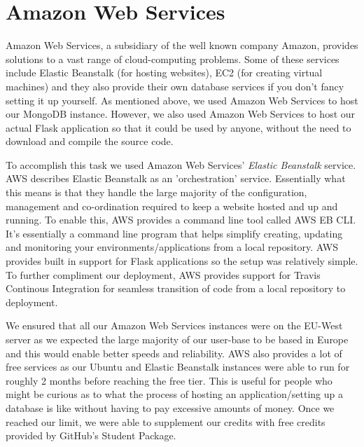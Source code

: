 \section{Amazon Web Services}
Amazon Web Services, a subsidiary of the well known company Amazon, provides solutions to a vast range of cloud-computing problems. Some of these services include Elastic Beanstalk (for hosting websites), EC2 (for creating virtual machines) and they also provide their own database services if you don't fancy setting it up yourself.
As mentioned above, we used Amazon Web Services to host our MongoDB instance. However, we also used Amazon Web Services to host our actual Flask application so that it could be used by anyone, without the need to download and compile the source code.

To accomplish this task we used Amazon Web Services' \textit{Elastic Beanstalk} service. AWS describes Elastic Beanstalk as an 'orchestration' service. Essentially what this means is that they handle the large majority of the configuration, management and co-ordination required to keep a website hosted and up and running. To enable this, AWS provides a command line tool called AWS EB CLI. It's essentially a command line program that helps simplify creating, updating and monitoring your environments/applications from a local repository. 
AWS provides built in support for Flask applications so the setup was relatively simple. To further compliment our deployment, AWS provides support for Travis Continous Integration for seamless transition of code from a local repository to deployment.

We ensured that all our Amazon Web Services instances were on the EU-West server as we expected the large majority of our user-base to be based in Europe and this would enable better speeds and reliability. AWS also provides a lot of free services as our Ubuntu and Elastic Beanstalk instances were able to run for roughly 2 months before reaching the free tier. This is useful 
for people who might be curious as to what the process of hosting an application/setting up a database is like without having to pay excessive amounts of money. Once we reached our limit, we were able to supplement our credits with free credits provided by GitHub's Student Package. 


